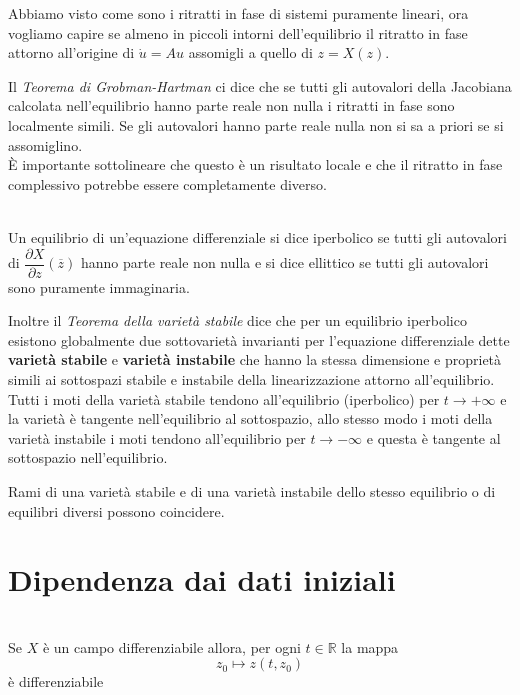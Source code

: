 \documentclass[11pt,a4paper,twoside]{book}
\newenvironment{proposizione}[1][\empty]{\begin{Proposizione}{
\ifx\empty#1\relax\else\mdseries\itshape#1\\\fi
}{}}{\end{Proposizione}}
\newenvironment{definizione}[1][\empty]{\begin{Definizione}{
\ifx\empty#1\relax\else\mdseries\itshape#1\\\fi
}{}}{\end{Definizione}}
\theoremstyle{esss}
\theoremstyle{dotless}
\numberwithin{equation}{section} %
\begin{document}
Abbiamo visto come sono i ritratti in fase di sistemi puramente lineari, ora vogliamo capire se almeno in piccoli intorni dell'equilibrio il ritratto in fase attorno all'origine di $\dot{u}=Au$ assomigli a quello di $z=X(z)$.

Il \textit{Teorema di Grobman-Hartman} ci dice che se tutti gli autovalori della Jacobiana calcolata nell'equilibrio hanno parte reale non nulla i ritratti in fase sono localmente simili. Se gli autovalori hanno parte reale nulla non si sa a priori se si assomiglino.\\È importante sottolineare che questo è un risultato locale e che il ritratto in fase complessivo potrebbe essere completamente diverso.



\begin{definizione}
Un equilibrio di un'equazione differenziale si dice iperbolico se tutti gli autovalori di $\dfrac{\partial X}{\partial z}(\overline{z})$ hanno parte reale non nulla e si dice ellittico se tutti gli autovalori sono puramente immaginaria.
\end{definizione}

Inoltre il \textit{Teorema della varietà stabile} dice che per un equilibrio iperbolico esistono globalmente due sottovarietà invarianti per l'equazione differenziale dette \textbf{varietà stabile} e \textbf{varietà instabile} che hanno la stessa dimensione e proprietà simili ai sottospazi stabile e instabile della linearizzazione attorno all'equilibrio. 
Tutti i moti della varietà stabile tendono all'equilibrio (iperbolico) per $t\rightarrow +\infty$ e la varietà è tangente nell'equilibrio al sottospazio, allo stesso modo i moti della varietà instabile i moti tendono all'equilibrio per $t\rightarrow -\infty$ e questa è tangente al sottospazio nell'equilibrio.

Rami di una varietà stabile e di una varietà instabile dello stesso equilibrio o di equilibri diversi possono coincidere.


\section{Dipendenza dai dati iniziali}

\begin{proposizione}\label{propMappaFlussoDifferenziabile}
Se $X$ è un campo differenziabile allora, per ogni $t\in\mathbb{R}$ la  mappa \[z_0\mapsto z(t,z_0)\] è differenziabile
\end{proposizione}
\end{document}

